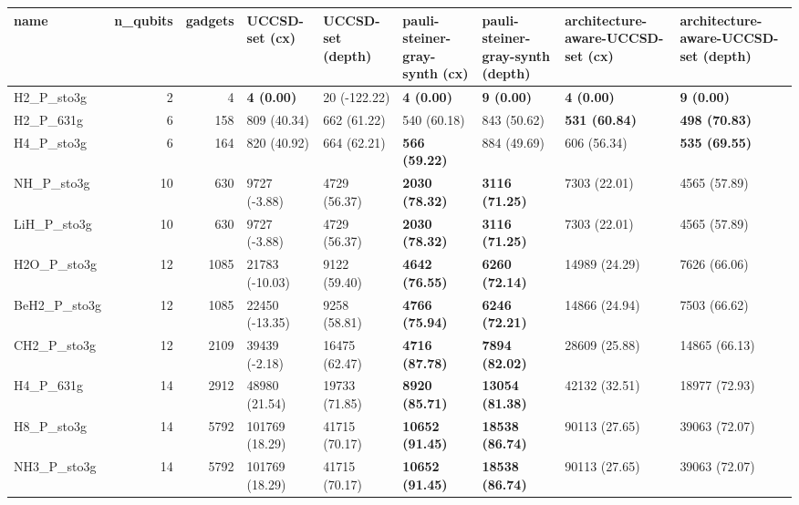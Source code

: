\begin{tabular}{lrrllllll}
\toprule
name & n\_qubits & gadgets & UCCSD-set (cx) & UCCSD-set (depth) & pauli-steiner-gray-synth (cx) & pauli-steiner-gray-synth (depth) & architecture-aware-UCCSD-set (cx) & architecture-aware-UCCSD-set (depth) \\
\midrule
H2\_P\_sto3g & 2 & 4 & \textbf{4 (0.00)} & 20 (-122.22) & \textbf{4 (0.00)} & \textbf{9 (0.00)} & \textbf{4 (0.00)} & \textbf{9 (0.00)} \\
H2\_P\_631g & 6 & 158 & 809 (40.34) & 662 (61.22) & 540 (60.18) & 843 (50.62) & \textbf{531 (60.84)} & \textbf{498 (70.83)} \\
H4\_P\_sto3g & 6 & 164 & 820 (40.92) & 664 (62.21) & \textbf{566 (59.22)} & 884 (49.69) & 606 (56.34) & \textbf{535 (69.55)} \\
NH\_P\_sto3g & 10 & 630 & 9727 (-3.88) & 4729 (56.37) & \textbf{2030 (78.32)} & \textbf{3116 (71.25)} & 7303 (22.01) & 4565 (57.89) \\
LiH\_P\_sto3g & 10 & 630 & 9727 (-3.88) & 4729 (56.37) & \textbf{2030 (78.32)} & \textbf{3116 (71.25)} & 7303 (22.01) & 4565 (57.89) \\
H2O\_P\_sto3g & 12 & 1085 & 21783 (-10.03) & 9122 (59.40) & \textbf{4642 (76.55)} & \textbf{6260 (72.14)} & 14989 (24.29) & 7626 (66.06) \\
BeH2\_P\_sto3g & 12 & 1085 & 22450 (-13.35) & 9258 (58.81) & \textbf{4766 (75.94)} & \textbf{6246 (72.21)} & 14866 (24.94) & 7503 (66.62) \\
CH2\_P\_sto3g & 12 & 2109 & 39439 (-2.18) & 16475 (62.47) & \textbf{4716 (87.78)} & \textbf{7894 (82.02)} & 28609 (25.88) & 14865 (66.13) \\
H4\_P\_631g & 14 & 2912 & 48980 (21.54) & 19733 (71.85) & \textbf{8920 (85.71)} & \textbf{13054 (81.38)} & 42132 (32.51) & 18977 (72.93) \\
H8\_P\_sto3g & 14 & 5792 & 101769 (18.29) & 41715 (70.17) & \textbf{10652 (91.45)} & \textbf{18538 (86.74)} & 90113 (27.65) & 39063 (72.07) \\
NH3\_P\_sto3g & 14 & 5792 & 101769 (18.29) & 41715 (70.17) & \textbf{10652 (91.45)} & \textbf{18538 (86.74)} & 90113 (27.65) & 39063 (72.07) \\
\bottomrule
\end{tabular}
